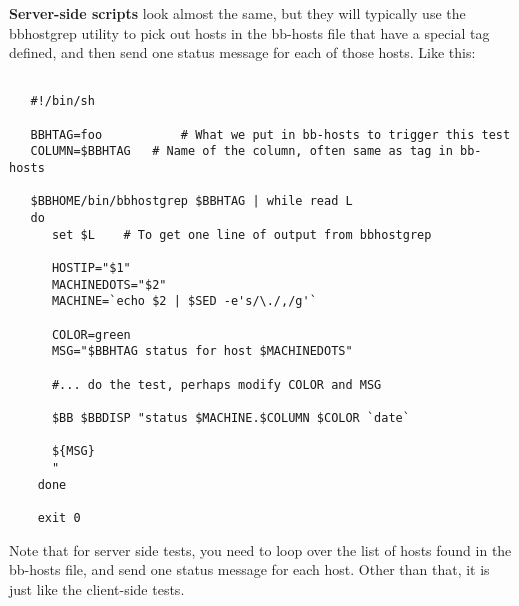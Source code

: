  


 \textbf{Server-side scripts}
 look almost the same, but they will typically use the bbhostgrep utility to pick out hosts in the bb-hosts file that have a special tag defined, and then send one status message for each of those hosts. Like this:
\begin{verbatim}

   #!/bin/sh

   BBHTAG=foo           # What we put in bb-hosts to trigger this test
   COLUMN=$BBHTAG	# Name of the column, often same as tag in bb-hosts

   $BBHOME/bin/bbhostgrep $BBHTAG | while read L
   do
      set $L	# To get one line of output from bbhostgrep

      HOSTIP="$1"
      MACHINEDOTS="$2"
      MACHINE=`echo $2 | $SED -e's/\./,/g'`

      COLOR=green
      MSG="$BBHTAG status for host $MACHINEDOTS"

      #... do the test, perhaps modify COLOR and MSG

      $BB $BBDISP "status $MACHINE.$COLUMN $COLOR `date`

      ${MSG}
      "
    done

    exit 0

\end{verbatim}


 Note that for server side tests, you need to loop over the list of hosts found in the bb-hosts file, and send one status message for each host. Other than that, it is just like the client-side tests.
 


